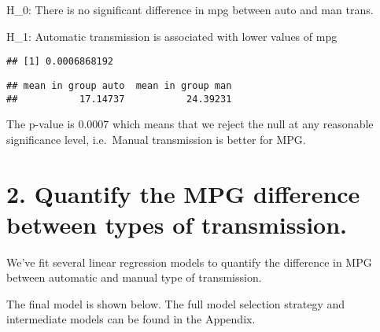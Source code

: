 \documentclass[
]{article}
\newenvironment{Shaded}{\begin{snugshade}}{\end{snugshade}}
\newcommand{\DataTypeTok}[1]{\textcolor[rgb]{0.13,0.29,0.53}{#1}}
\newcommand{\KeywordTok}[1]{\textcolor[rgb]{0.13,0.29,0.53}{\textbf{#1}}}
\newcommand{\NormalTok}[1]{#1}
\newcommand{\OperatorTok}[1]{\textcolor[rgb]{0.81,0.36,0.00}{\textbf{#1}}}
\newcommand{\OtherTok}[1]{\textcolor[rgb]{0.56,0.35,0.01}{#1}}
\newcommand{\StringTok}[1]{\textcolor[rgb]{0.31,0.60,0.02}{#1}}
\begin{document}
H\_0: There is no significant difference in mpg between auto and man
trans.

H\_1: Automatic transmission is associated with lower values of mpg

\begin{Shaded}
\end{Shaded}

\begin{verbatim}
## [1] 0.0006868192
\end{verbatim}

\begin{Shaded}
\end{Shaded}

\begin{verbatim}
## mean in group auto  mean in group man 
##           17.14737           24.39231
\end{verbatim}

The p-value is 0.0007 which means that we reject the null at any
reasonable significance level, i.e.~Manual transmission is better for
MPG.

\hypertarget{quantify-the-mpg-difference-between-types-of-transmission.}{%
\section{2. Quantify the MPG difference between types of
transmission.}\label{quantify-the-mpg-difference-between-types-of-transmission.}}

We've fit several linear regression models to quantify the difference in
MPG between automatic and manual type of transmission.

The final model is shown below. The full model selection strategy and
intermediate models can be found in the Appendix.
\end{document}
